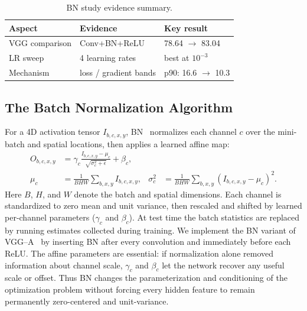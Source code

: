 \documentclass[11pt]{article}
\newcommand{\bnStdAcc}{78.64}    %
\newcommand{\bnBnAcc}{83.04}     %
\newcommand{\bnGradStd}{16.6}
\newcommand{\bnGradBn}{10.3}
\begin{document}
\begin{table}[htbp]
\centering
\small
\caption{BN study evidence summary.}
\label{tab:bnscore}
\begin{tabular}{lll}
\toprule
Aspect & Evidence & Key result \\
\midrule
VGG comparison & Conv+BN+ReLU & \bnStdAcc{} $\rightarrow$ \bnBnAcc{} \\
LR sweep & 4 learning rates & best at $10^{-3}$ \\
Mechanism & loss / gradient bands & p90: \bnGradStd{} $\rightarrow$ \bnGradBn{} \\
\bottomrule
\end{tabular}
\end{table}

\subsection{The Batch Normalization Algorithm}
For a 4D activation tensor $I_{b,c,x,y}$, BN~\citep{ioffe2015batch} normalizes
each channel $c$ over the mini-batch and spatial locations, then applies a
learned affine map:
\begin{equation}
\begin{aligned}
O_{b,c,x,y}
&= \gamma_c \frac{I_{b,c,x,y}-\mu_c}{\sqrt{\sigma_c^2+\epsilon}} + \beta_c,\\
\mu_c
&= \frac{1}{BHW}\sum_{b,x,y} I_{b,c,x,y},
&
\sigma_c^2
&= \frac{1}{BHW}\sum_{b,x,y} (I_{b,c,x,y}-\mu_c)^2 .
\end{aligned}
\end{equation}
Here $B$, $H$, and $W$ denote the batch and spatial dimensions. Each
channel is standardized to zero mean and unit variance, then rescaled and
shifted by learned per-channel parameters ($\gamma_c$ and $\beta_c$). At test
time the batch statistics are replaced by running estimates collected during
training. We implement the BN variant of VGG--A~\citep{simonyan2015very} by
inserting BN after every convolution and immediately before each ReLU.
The affine parameters are essential: if normalization alone removed information
about channel scale, $\gamma_c$ and $\beta_c$ let the network recover any useful
scale or offset. Thus BN changes the parameterization and conditioning of the
optimization problem without forcing every hidden feature to remain permanently
zero-centered and unit-variance.
\end{document}
